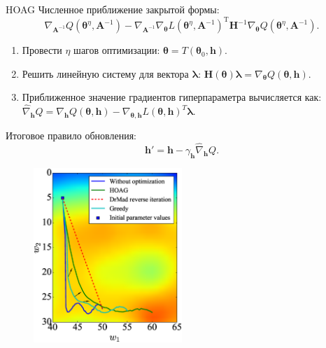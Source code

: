 \documentclass[10pt,pdf,utf8,russian,aspectratio=169]{beamer}
\begin{document}
\begin{frame}{HOAG}
Численное приближение закрытой формы:
 \[\nabla_{\mathbf{A}^{-1}}Q(\boldsymbol{\theta}^\eta, \mathbf{A}^{-1}) - \nabla_{\mathbf{A}^{-1}}\nabla_{\boldsymbol{\theta}} L(\boldsymbol{\theta}^\eta, \mathbf{A}^{-1})^\text{T}\mathbf{H}^{-1}\nabla_{\boldsymbol{\theta}}Q(\boldsymbol{\theta}^\eta, \mathbf{A}^{-1}).\]
\begin{enumerate}
\item Провести $\eta$ шагов оптимизации: $\boldsymbol{\theta} = T(\boldsymbol{\theta}_0, \mathbf{h})$.
\item Решить линейную систему для вектора $\boldsymbol{\lambda}$: $\mathbf{H}(\boldsymbol{\theta})\boldsymbol{\lambda} =  \nabla_{\boldsymbol{\theta}} Q(\boldsymbol{\theta}, \mathbf{h})$.
\item Приближенное значение градиентов гиперпараметра вычисляется как: $\hat{\nabla}_{\mathbf{h}}Q = \nabla_{\mathbf{h}}Q(\boldsymbol{\theta}, \mathbf{h}) -\nabla_{\boldsymbol{\theta}, \mathbf{h}} L(\boldsymbol{\theta}, \mathbf{h})^T\boldsymbol{\lambda}$.
\end{enumerate}

Итоговое правило обновления:
\[
\label{eq:update_hyper}
\mathbf{h}' = \mathbf{h} - \gamma_{\mathbf{h}} \hat{\nabla}_{\mathbf{h}}Q.
\]


\end{frame}


\begin{frame}
\begin{figure}  
\includegraphics[width=0.5\textwidth]{Fig_traj.eps}
\end{figure}
\end{frame}
\end{document}
